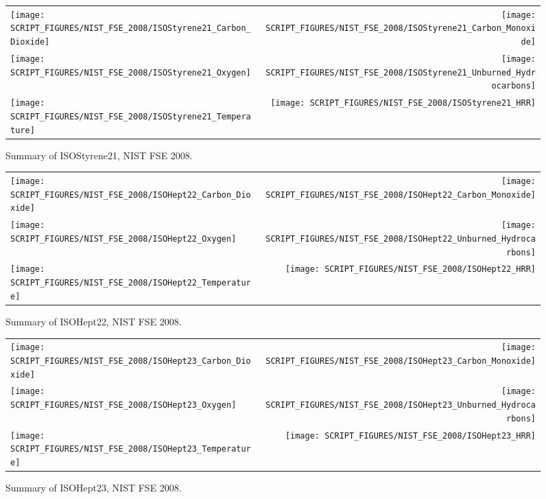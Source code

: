 \begin{figure}[p]
\begin{tabular*}{\textwidth}{l@{\extracolsep{\fill}}r}
\texttt{[image: SCRIPT\_FIGURES/NIST\_FSE\_2008/ISOStyrene21\_Carbon\_Dioxide]} &
\texttt{[image: SCRIPT\_FIGURES/NIST\_FSE\_2008/ISOStyrene21\_Carbon\_Monoxide]} \\
\texttt{[image: SCRIPT\_FIGURES/NIST\_FSE\_2008/ISOStyrene21\_Oxygen]} &
\texttt{[image: SCRIPT\_FIGURES/NIST\_FSE\_2008/ISOStyrene21\_Unburned\_Hydrocarbons]} \\
\texttt{[image: SCRIPT\_FIGURES/NIST\_FSE\_2008/ISOStyrene21\_Temperature]} &
\texttt{[image: SCRIPT\_FIGURES/NIST\_FSE\_2008/ISOStyrene21\_HRR]}
\end{tabular*}
\caption[Summary of ISOStyrene21, NIST FSE 2008]{Summary of ISOStyrene21, NIST FSE 2008.}
\label{NIST_FSE_1994_ISOStyrene21}
\end{figure}

\begin{figure}[p]
\begin{tabular*}{\textwidth}{l@{\extracolsep{\fill}}r}
\texttt{[image: SCRIPT\_FIGURES/NIST\_FSE\_2008/ISOHept22\_Carbon\_Dioxide]} &
\texttt{[image: SCRIPT\_FIGURES/NIST\_FSE\_2008/ISOHept22\_Carbon\_Monoxide]} \\
\texttt{[image: SCRIPT\_FIGURES/NIST\_FSE\_2008/ISOHept22\_Oxygen]} &
\texttt{[image: SCRIPT\_FIGURES/NIST\_FSE\_2008/ISOHept22\_Unburned\_Hydrocarbons]} \\
\texttt{[image: SCRIPT\_FIGURES/NIST\_FSE\_2008/ISOHept22\_Temperature]} &
\texttt{[image: SCRIPT\_FIGURES/NIST\_FSE\_2008/ISOHept22\_HRR]}
\end{tabular*}
\caption[Summary of ISOHept22, NIST FSE 2008]{Summary of ISOHept22, NIST FSE 2008.}
\label{NIST_FSE_1994_ISOHept22}
\end{figure}

\begin{figure}[p]
\begin{tabular*}{\textwidth}{l@{\extracolsep{\fill}}r}
\texttt{[image: SCRIPT\_FIGURES/NIST\_FSE\_2008/ISOHept23\_Carbon\_Dioxide]} &
\texttt{[image: SCRIPT\_FIGURES/NIST\_FSE\_2008/ISOHept23\_Carbon\_Monoxide]} \\
\texttt{[image: SCRIPT\_FIGURES/NIST\_FSE\_2008/ISOHept23\_Oxygen]} &
\texttt{[image: SCRIPT\_FIGURES/NIST\_FSE\_2008/ISOHept23\_Unburned\_Hydrocarbons]} \\
\texttt{[image: SCRIPT\_FIGURES/NIST\_FSE\_2008/ISOHept23\_Temperature]} &
\texttt{[image: SCRIPT\_FIGURES/NIST\_FSE\_2008/ISOHept23\_HRR]}
\end{tabular*}
\caption[Summary of ISOHept23, NIST FSE 2008]{Summary of ISOHept23, NIST FSE 2008.}
\label{NIST_FSE_1994_ISOHept23}
\end{figure}

